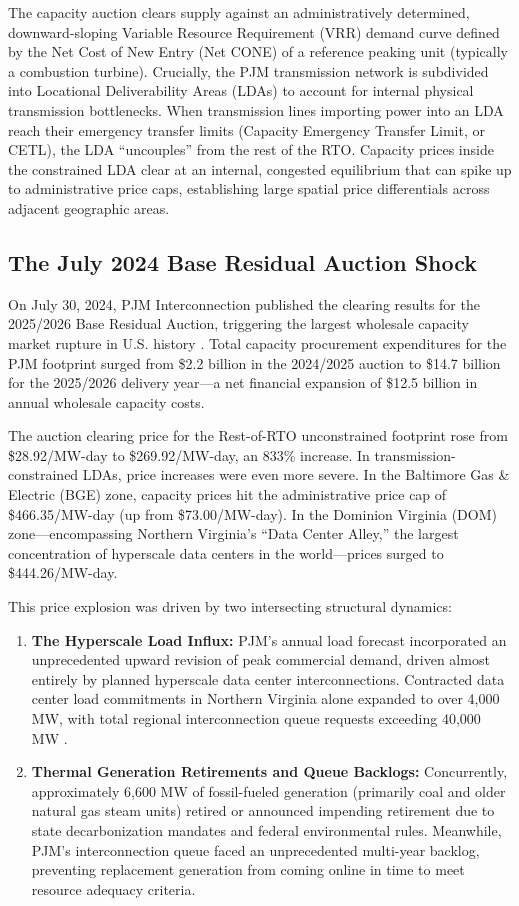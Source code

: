 \documentclass[11pt,a4paper]{article}
\begin{document}
The capacity auction clears supply against an administratively determined, downward-sloping Variable Resource Requirement (VRR) demand curve defined by the Net Cost of New Entry (Net CONE) of a reference peaking unit (typically a combustion turbine). Crucially, the PJM transmission network is subdivided into Locational Deliverability Areas (LDAs) to account for internal physical transmission bottlenecks. When transmission lines importing power into an LDA reach their emergency transfer limits (Capacity Emergency Transfer Limit, or CETL), the LDA ``uncouples'' from the rest of the RTO. Capacity prices inside the constrained LDA clear at an internal, congested equilibrium that can spike up to administrative price caps, establishing large spatial price differentials across adjacent geographic areas.

\subsection{The July 2024 Base Residual Auction Shock}

On July 30, 2024, PJM Interconnection published the clearing results for the 2025/2026 Base Residual Auction, triggering the largest wholesale capacity market rupture in U.S. history \citep{pjm2024bra}. Total capacity procurement expenditures for the PJM footprint surged from \$2.2 billion in the 2024/2025 auction to \$14.7 billion for the 2025/2026 delivery year---a net financial expansion of \$12.5 billion in annual wholesale capacity costs.

The auction clearing price for the Rest-of-RTO unconstrained footprint rose from \$28.92/MW-day to \$269.92/MW-day, an 833\% increase. In transmission-constrained LDAs, price increases were even more severe. In the Baltimore Gas \& Electric (BGE) zone, capacity prices hit the administrative price cap of \$466.35/MW-day (up from \$73.00/MW-day). In the Dominion Virginia (DOM) zone---encompassing Northern Virginia's ``Data Center Alley,'' the largest concentration of hyperscale data centers in the world---prices surged to \$444.26/MW-day.

This price explosion was driven by two intersecting structural dynamics:
\begin{enumerate}
    \item \textbf{The Hyperscale Load Influx:} PJM's annual load forecast incorporated an unprecedented upward revision of peak commercial demand, driven almost entirely by planned hyperscale data center interconnections. Contracted data center load commitments in Northern Virginia alone expanded to over 4,000 MW, with total regional interconnection queue requests exceeding 40,000 MW \citep{pjm2024loadforecast}.
    \item \textbf{Thermal Generation Retirements and Queue Backlogs:} Concurrently, approximately 6,600 MW of fossil-fueled generation (primarily coal and older natural gas steam units) retired or announced impending retirement due to state decarbonization mandates and federal environmental rules. Meanwhile, PJM's interconnection queue faced an unprecedented multi-year backlog, preventing replacement generation from coming online in time to meet resource adequacy criteria.
\end{enumerate}
\end{document}
